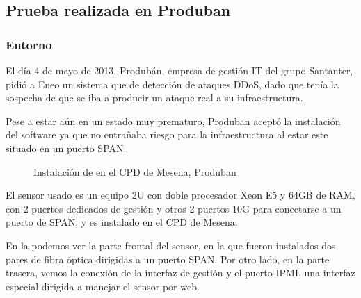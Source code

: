 \subsection{Prueba realizada en Produban}
\subsubsection{Entorno}
El día 4 de mayo de 2013, Produbán, empresa de gestión IT del grupo Santanter, pidió a Eneo un sistema que de detección 
de ataques \gls{DDoS}, dado que tenía la sospecha de que se iba a producir un ataque real a su infraestructura.

Pese a estar aún en un estado muy prematuro, Produban aceptó la instalación del software ya que no entrañaba riesgo 
para la infraestructura al estar este situado en un puerto SPAN.

\begin{figure}[hbtp]
\centering
{}
\hfill
{}
%
\caption{Instalación de \redborderddos{} en el CPD de Mesena, Produban}
\end{figure}
%
El sensor usado es un equipo 2U con doble procesador Xeon E5 y 64GB de RAM, con 2 puertos dedicados de gestión y otros 
2 puertos 10G para conectarse a un puerto de SPAN, y es instalado en el CPD de Mesena.

En la  podemos ver la parte frontal del sensor, en la que fueron instalados dos pares de fibra 
óptica dirigidas a un puerto SPAN. Por otro lado, en la parte trasera, vemos la conexión de la interfaz de gestión y el 
puerto IPMI, una interfaz especial dirigida a manejar el sensor por web.

